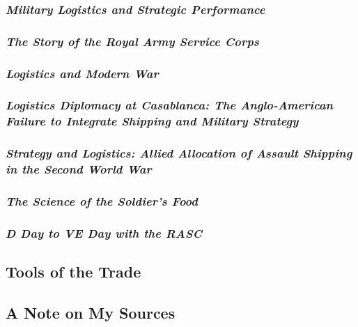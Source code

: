 \documentclass[noraggedright]{turabian-researchpaper}
\begin{document}
		\subsubsection{\textit{Military Logistics and Strategic 
			Performance}}
		\subsubsection{\textit{The Story of the Royal Army Service
			Corps}}
		\subsubsection{\textit{Logistics and Modern War}}
		\subsubsection{\textit{Logistics Diplomacy at Casablanca: 
			The Anglo-American Failure to Integrate Shipping and
			Military Strategy}}
		\subsubsection{\textit{Strategy and Logistics:  Allied
			Allocation of Assault Shipping in the Second World
			War}}
		\subsubsection{\textit{The Science of the Soldier's Food}}
		\subsubsection{\textit{D Day to VE Day with the RASC}}
	
		

		

	\subsection{Tools of the Trade} %

	
	\subsection{A Note on My Sources}
		

\end{document}
